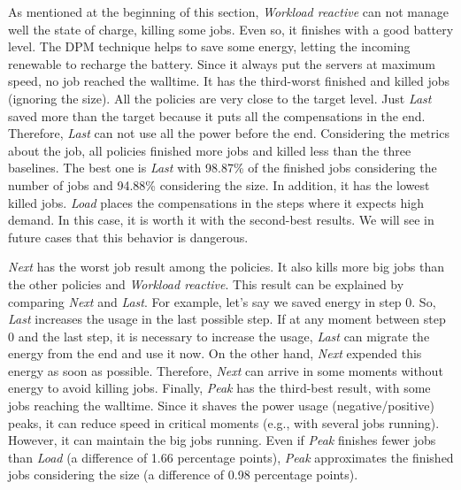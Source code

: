 As mentioned at the beginning of this section, \emph{Workload reactive} can not manage well the state of charge, killing some jobs. Even so, it finishes with a good battery level. The DPM technique helps to save some energy, letting the incoming renewable to recharge the battery. Since it always put the servers at maximum speed, no job reached the walltime. It has the third-worst finished and killed jobs (ignoring the size). All the policies are very close to the target level. Just \emph{Last} saved more than the target because it puts all the compensations in the end. Therefore, \emph{Last} can not use all the power before the end. Considering the metrics about the job, all policies finished more jobs and killed less than the three baselines. The best one is \emph{Last} with 98.87\% of the finished jobs considering the number of jobs and 94.88\% considering the size. In addition, it has the lowest killed jobs. \emph{Load} places the compensations in the steps where it expects high demand. In this case, it is worth it with the second-best results. We will see in future cases that this behavior is dangerous. 

\emph{Next} has the worst job result among the policies. It also kills more big jobs than the other policies and \emph{Workload reactive}. This result can be explained by comparing \emph{Next} and \emph{Last}. For example, let's say we saved energy in step 0. So, \emph{Last} increases the usage in the last possible step. If at any moment between step 0 and the last step, it is necessary to increase the usage, \emph{Last} can migrate the energy from the end and use it now. On the other hand, \emph{Next} expended this energy as soon as possible. Therefore, \emph{Next} can arrive in some moments without energy to avoid killing jobs. Finally, \emph{Peak} has the third-best result, with some jobs reaching the walltime. Since it shaves the power usage (negative/positive) peaks, it can reduce speed in critical moments (e.g., with several jobs running). However, it can maintain the big jobs running. Even if \emph{Peak} finishes fewer jobs than \emph{Load} (a difference of 1.66 percentage points), \emph{Peak} approximates the finished jobs considering the size (a difference of 0.98 percentage points).

